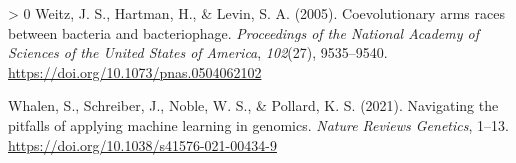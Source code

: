 \documentclass[11pt]{article}
\newlength{\cslhangindent}
\newenvironment{CSLReferences}[3] %
 {%
  \setlength{\parindent}{0pt}
  \ifodd #1 \everypar{\setlength{\hangindent}{\cslhangindent}}\ignorespaces\fi
  \ifnum #2 > 0
  \setlength{\parskip}{#2\baselineskip}
  \fi
 }%
 {}
\begin{document}
\begin{CSLReferences}{1}{0}
\leavevmode\hypertarget{ref-Weitz2005CoeArm}{}%
Weitz, J. S., Hartman, H., \& Levin, S. A. (2005). Coevolutionary arms
races between bacteria and bacteriophage. \emph{Proceedings of the
National Academy of Sciences of the United States of America},
\emph{102}(27), 9535--9540.
\url{https://doi.org/10.1073/pnas.0504062102}

\leavevmode\hypertarget{ref-Whalen2021NavPit}{}%
Whalen, S., Schreiber, J., Noble, W. S., \& Pollard, K. S. (2021).
Navigating the pitfalls of applying machine learning in genomics.
\emph{Nature Reviews Genetics}, 1--13.
\url{https://doi.org/10.1038/s41576-021-00434-9}

\end{CSLReferences}
\end{document}
